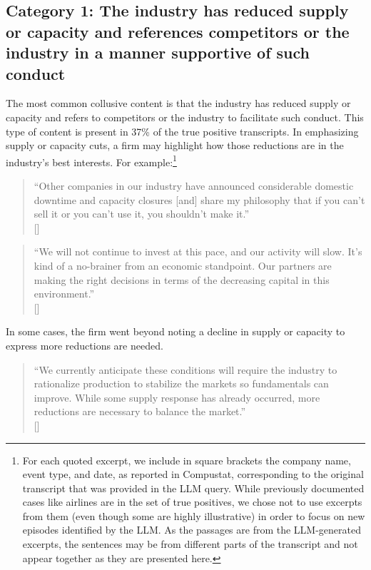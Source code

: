 \subsection{Category 1: The industry has reduced supply or capacity and references competitors or the industry in a manner supportive of such conduct}
The most common collusive content is that the industry has reduced supply or capacity and refers to competitors or the industry to facilitate such conduct. This type of content is present in 37\% of the  true positive transcripts. In emphasizing supply or capacity cuts, a firm may highlight how those reductions are in the industry's best interests. For example:\footnote{For each quoted excerpt, we include in square brackets the company name, event type, and date, as reported in Compustat, corresponding to the original transcript that was provided in the LLM query. While previously documented cases like airlines are in the set of true positives, we chose not to use excerpts from them (even though some are highly illustrative) in order to focus on new episodes identified by the LLM. As the passages are from the LLM-generated excerpts, the sentences may be from different parts of the transcript and not appear together as they are presented here.}

\begin{quote}
``Other companies in our industry have announced considerable domestic downtime and capacity closures [and] share my philosophy that if you can't sell it or you can't use it, you shouldn't make it.'' \\
\mbox{[]}
\end{quote}

\begin{quote}
``We will not continue to invest at this pace, and our activity will slow. It's kind of a no-brainer from an economic standpoint. Our partners are making the right decisions in terms of the decreasing capital in this environment.'' \\
\mbox{[]}
\end{quote}

In some cases, the firm went beyond noting a decline in supply or capacity to express more reductions are needed.

\begin{quote}
``We currently anticipate these conditions will require the industry to rationalize production to stabilize the markets so fundamentals can improve. While some supply response has already occurred, more reductions are necessary to balance the market.'' \\
\mbox{[]}
\end{quote}

